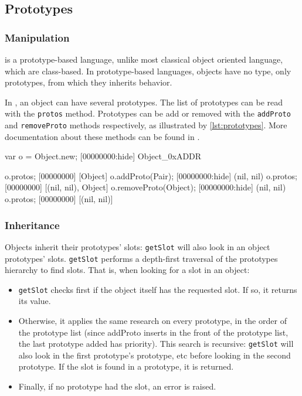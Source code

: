 \subsection{Prototypes}

\subsubsection{Manipulation}

\us is a prototype-based language, unlike most classical object
oriented language, which are class-based. In prototype-based
languages, objects have no type, only prototypes, from which they
inherits behavior.

In \us, an object can have several prototypes. The list of prototypes
can be read with the \lstinline|protos| method. Prototypes can be add
or removed with the \lstinline|addProto| and \lstinline|removeProto|
methods respectively, as illustrated by \autoref{lst:prototypes}. More
documentation about these methods can be found in .

\begin{urbiscript}[caption=Manipulating prototypes, label=lst:prototypes,
  float=\floatpos]
var o = Object.new;
[00000000:hide] Object_0xADDR

o.protos;
[00000000] [Object]
o.addProto(Pair);
[00000000:hide] (nil, nil)
o.protos;
[00000000] [(nil, nil), Object]
o.removeProto(Object);
[00000000:hide] (nil, nil)
o.protos;
[00000000] [(nil, nil)]
\end{urbiscript}

\subsubsection{Inheritance}

Objects inherit their prototypes' slots: \lstinline|getSlot| will also
look in an object prototypes' slots. \lstinline|getSlot| performs a
depth-first traversal of the prototypes hierarchy to find slots. That
is, when looking for a slot in an object:

\begin{itemize}
\item \lstinline|getSlot| checks first if the object itself has the
  requested slot. If so, it returns its value.
\item Otherwise, it applies the same research on every prototype, in
  the order of the prototype list (since addProto inserts in the front
  of the prototype list, the last prototype added has priority). This
  search is recursive: \lstinline|getSlot| will also look in the first
  prototype's prototype, etc before looking in the second
  prototype. If the slot is found in a prototype, it is returned.
\item Finally, if no prototype had the slot, an error is raised.
\end{itemize}

